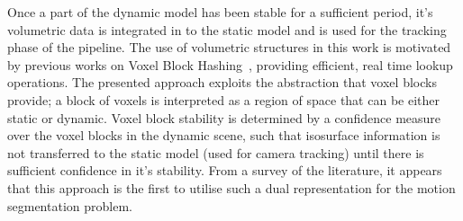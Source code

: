 Once a part of the dynamic model has been stable for a sufficient period, it's
volumetric data is integrated in to the static model and is used for the
tracking phase of the pipeline. The use of volumetric structures in this work
is motivated by previous works on Voxel Block Hashing~\cite{NieBner2013},
providing efficient, real time lookup operations. The presented approach
exploits the abstraction that voxel blocks provide; a block of voxels is
interpreted as a region of space that can be either static or dynamic.
Voxel block stability is determined by a confidence measure over the voxel
blocks in the dynamic scene, such that isosurface information is not transferred
to the static model (used for camera tracking) until there is sufficient
confidence in it's stability. From a survey of the literature, it appears that 
this approach is the first to utilise such a dual representation for the motion 
segmentation problem.

